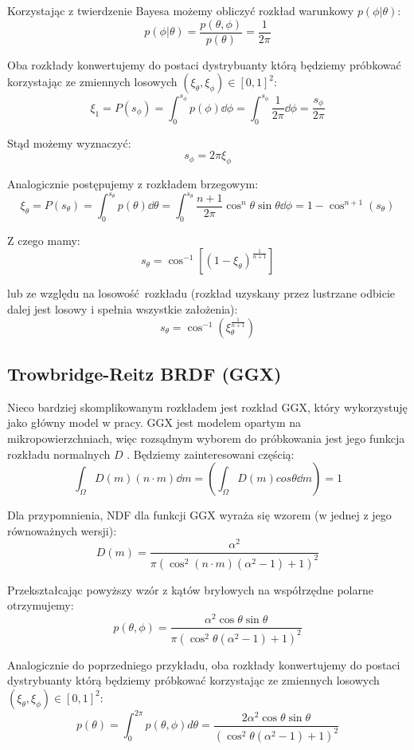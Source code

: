 \documentclass[../main.tex]{subfiles}
\begin{document}
Korzystając z twierdzenie Bayesa możemy obliczyć rozkład warunkowy $p(\phi | \theta)$:
\[
  p(\phi | \theta) = \frac{
    p(\theta, \phi)
	}{
		p(\theta)
	} = \frac{1}{2\pi}
\]

Oba rozkłady konwertujemy do postaci dystrybuanty którą będziemy próbkować
korzystając ze zmiennych losowych $(\xi_{\theta}, \xi_{\phi}) \in [0,1]^2$:
\[
	\xi_1 = P(s_{\phi}) =
	\int_{0}^{s_{\phi}} {
		p(\phi) \dd \phi
	} =
	\int_{0}^{s_{\phi}} {
		\frac{1}{2\pi} \dd \phi
	} =
	\frac{s_{\phi}}{2\pi}
\]

Stąd możemy wyznaczyć:
\[
	s_{\phi} = 2 \pi \xi_{\phi}
\]

Analogicznie postępujemy z rozkładem brzegowym:
\[
  \xi_{\theta} = P(s_{\theta}) =
	\int_{0}^{s_{\theta}} {
		p(\theta) \dd \theta
	} =
	\int_{0}^{s_{\theta}} {
		\frac{n+1}{2\pi} \cos^{n}\theta \sin\theta \dd\phi
	} =
	1 - \cos^{n+1}(s_{\theta})
\]

Z czego mamy:
\[
	s_{\theta} =
	\cos^{-1}\left[
		(1 - \xi_{\theta})^{\frac{1}{n+1}}
	\right]
\]

lub ze względu na losowość rozkładu (rozkład uzyskany przez lustrzane odbicie
dalej jest losowy i spełnia wszystkie założenia):
\[
	s_{\theta} =
	\cos^{-1}\left(
		\xi_{\theta}^{\frac{1}{n+1}}
	\right)
\]

\subsection{Trowbridge-Reitz BRDF (GGX)}

Nieco bardziej skomplikowanym rozkładem jest rozkład GGX, który wykorzystuję jako główny model w pracy. GGX jest modelem opartym na mikropowierzchniach, więc rozsądnym wyborem do próbkowania jest jego funkcja rozkładu normalnych $D$ \cite{NotesImportanceSampling}. Będziemy zainteresowani częścią:
\[
  \int_{\Omega} D(m) (n \cdot m) \dd m = \left(\int_{\Omega} D(m) cos\theta \dd m\right) = 1
\]

Dla przypomnienia, NDF dla funkcji GGX wyraża się wzorem (w jednej z jego równoważnych wersji):
\[
	D(m) = \frac{
		\alpha^2
	}{
    \pi \left(
      \cos^{2}(n \cdot m)(\alpha^2 - 1) + 1
    \right)^{2}
  }
\]

Przekształcając powyższy wzór z kątów bryłowych na współrzędne polarne otrzymujemy:
\[
  p(\theta, \phi) =
	\frac{
    \alpha^2 \cos\theta \sin\theta
	}{
    \pi \left(
      \cos^{2}\theta (\alpha^2 - 1) + 1
    \right)^{2}
  }
\]

Analogicznie do poprzedniego przykładu, oba rozkłady konwertujemy do postaci
dystrybuanty którą będziemy próbkować korzystając ze zmiennych losowych
  $(\xi_{\theta}, \xi_{\phi}) \in [0,1]^2$:
\[
  p(\theta) = \int_{0}^{2\pi} {
    p(\theta, \phi) d \theta
  } =
  \frac{2 \alpha^2 \cos\theta \sin\theta}{
    \left(
      \cos^{2}\theta (\alpha^2 - 1) + 1
    \right)^{2}
  }
\]
\end{document}
